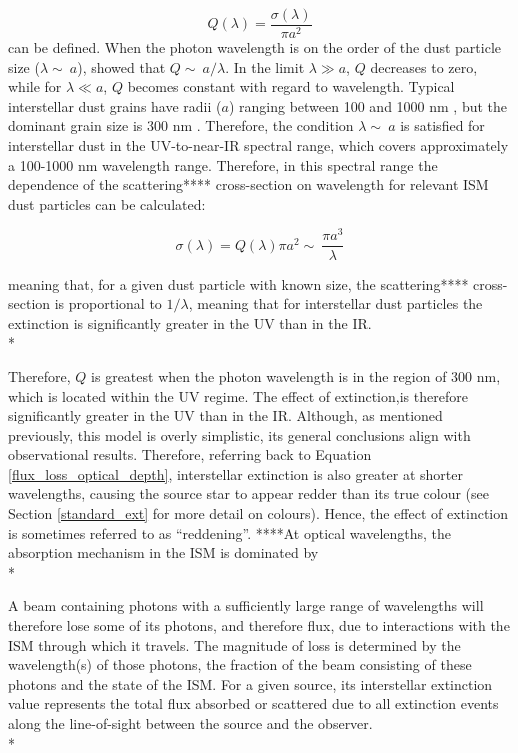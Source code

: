 \documentclass[12pt, a4paper]{report}
\begin{document}
\begin{equation}
Q(\lambda) = \frac{\sigma(\lambda)}{\pi a^{2}}
\label{ext_wavelength}
\end{equation}
can be defined. When the photon wavelength is on the order of the dust particle size ($\lambda \sim\ a$), \cite{1908AnP...330..377M} showed that $Q \sim\ a/\lambda$. In the limit $\lambda \gg a$, $Q$ decreases to zero, while for $\lambda \ll a$, $Q$ becomes constant with regard to wavelength. Typical interstellar dust grains have radii ($a$) ranging between 100 and 1000 nm \citep{2000JGR...10510299W}, but the dominant grain size is 300 nm \citep{2003JGRA..108.8030L}. Therefore, the condition $\lambda \sim\ a$ is satisfied for interstellar dust in the UV-to-near-IR spectral range, which covers approximately a 100-1000 nm wavelength range. Therefore, in this spectral range the dependence of the scattering**** cross-section on wavelength for relevant ISM dust particles can be calculated:

\begin{equation}
\sigma(\lambda) = Q(\lambda){\pi a^{2}} \sim\ \frac{\pi a^{3}}{\lambda}
\label{x_section_wavelength}
\end{equation}

meaning that, for a given dust particle with known size, the scattering**** cross-section is proportional to $1/\lambda$, meaning that for interstellar dust particles the extinction is significantly greater in the UV than in the IR. \\*


Therefore, $Q$ is greatest when the photon wavelength is in the region of 300 nm, which is located within the UV regime. The effect of extinction,is therefore significantly greater in the UV than in the IR. Although, as mentioned previously, this model is overly simplistic, its general conclusions align with observational results. Therefore, referring back to Equation \ref{flux_loss_optical_depth}, interstellar extinction is also greater at shorter wavelengths, causing the source star to appear redder than its true colour (see Section \ref{standard_ext} for more detail on colours). Hence, the effect of extinction is sometimes referred to as ``reddening''. ****At optical wavelengths, the absorption mechanism in the ISM is dominated by \\* 


A beam containing photons with a sufficiently large range of wavelengths will therefore lose some of its photons, and therefore flux, due to interactions with the ISM through which it travels. The magnitude of loss is determined by the wavelength(s) of those photons, the fraction of the beam consisting of these photons and the state of the ISM. For a given source, its interstellar extinction value represents the total flux absorbed or scattered due to all extinction events along the line-of-sight between the source and the observer.\\*
\end{document}
